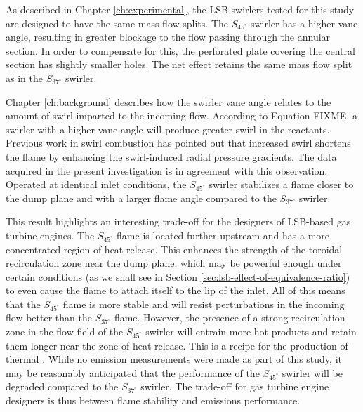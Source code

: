 As described in Chapter \ref{ch:experimental}, the LSB swirlers tested for this study are designed to have the same mass flow splits.
The \(S_{45^\circ}\) swirler has a higher vane angle, resulting in greater blockage to the flow passing through the annular section.
In order to compensate for this, the perforated plate covering the central section has slightly smaller holes.
The net effect retains the same mass flow split as in the \(S_{37^\circ}\) swirler.

Chapter \ref{ch:background} describes how the swirler vane angle relates to the amount of swirl imparted to the incoming flow.
According to Equation FIXME, a swirler with a higher vane angle will produce greater swirl in the reactants.
Previous work in swirl combustion\cite{1992-chan,1986-starner} has pointed out that increased swirl shortens the flame by enhancing the swirl-induced radial pressure gradients.
The data acquired in the present investigation is in agreement with this observation.
Operated at identical inlet conditions, the \(S_{45^\circ}\) swirler stabilizes a flame closer to the dump plane and with a larger flame angle compared to the \(S_{37^\circ}\) swirler.

This result highlights an interesting trade-off for the designers of LSB-based gas turbine engines.
The \(S_{45^\circ}\) flame is located further upstream and has a more concentrated region of heat release.
This enhances the strength of the toroidal recirculation zone near the dump plane, which may be powerful enough under certain conditions (as we shall see in Section \ref{sec:lsb-effect-of-equivalence-ratio}) to even cause the flame to attach itself to the lip of the inlet.
All of this means that the \(S_{45^\circ}\) flame is more stable and will resist perturbations in the incoming flow better than the \(S_{37^\circ}\) flame.
However, the presence of a strong recirculation zone in the flow field of the \(S_{45^\circ}\) swirler will entrain more hot products and retain them longer near the zone of heat release.
This is a recipe for the production of thermal .
While no emission measurements were made as part of this study, it may be reasonably anticipated that the  performance of the \(S_{45^\circ}\) swirler will be degraded compared to the \(S_{37^\circ}\) swirler.
The trade-off for gas turbine engine designers is thus between flame stability and emissions performance.

